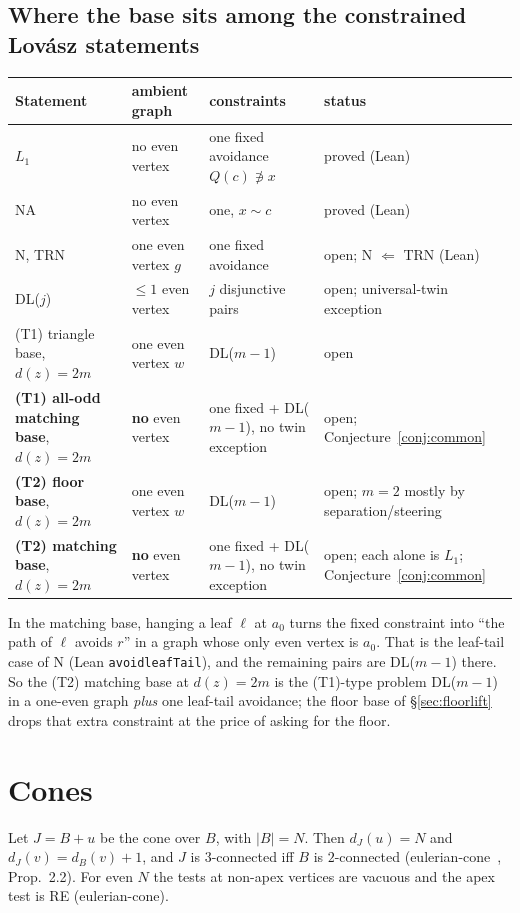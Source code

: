 \documentclass[11pt]{amsart}
\theoremstyle{definition}
\theoremstyle{remark}
\renewcommand{\_}{\oldunderscore\allowbreak}
\begin{document}
\subsection*{Where the base sits among the constrained Lov\'asz statements}
\begin{center}
\begin{tabular}{p{}p{}p{}p{}}
\toprule
Statement & ambient graph & constraints & status\\
\midrule
$L_1$ & no even vertex & one fixed avoidance $Q(c)\not\ni x$ & proved (Lean)\\
NA & no even vertex & one, $x\sim c$ & proved (Lean)\\
N, TRN & one even vertex $g$ & one fixed avoidance & open; N $\Leftarrow$ TRN (Lean)\\
DL($j$) & $\le1$ even vertex & $j$ disjunctive pairs & open; universal-twin exception\\
(T1) triangle base, $d(z)=2m$ & one even vertex $w$ & DL($m-1$) & open\\
\textbf{(T1) all-odd matching base}, $d(z)=2m$ & \textbf{no} even vertex & one fixed + DL($m-1$),
no twin exception & open; Conjecture~\ref{conj:common}\\
\textbf{(T2) floor base}, $d(z)=2m$ & one even vertex $w$ & DL($m-1$) & open; $m=2$ mostly by
separation/steering\\
\textbf{(T2) matching base}, $d(z)=2m$ & \textbf{no} even vertex & one fixed + DL($m-1$),
no twin exception & open; each alone is $L_1$; Conjecture~\ref{conj:common}\\
\bottomrule
\end{tabular}
\end{center}
In the matching base, hanging a leaf $\ell$ at $a_0$ turns the fixed constraint into ``the path of
$\ell$ avoids $r$'' in a graph whose only even vertex is $a_0$. That is the leaf-tail case of N (Lean
\texttt{avoid\_leafTail}), and the remaining pairs are DL($m-1$) there. So the (T2) matching base at
$d(z)=2m$ is the (T1)-type problem DL($m-1$) in a one-even graph \emph{plus} one leaf-tail avoidance;
the floor base of \S\ref{sec:floorlift} drops that extra constraint at the price of asking for the
floor.

\section{Cones}\label{sec:cones}

Let $J=B+u$ be the cone over $B$, with $|B|=N$. Then $d_J(u)=N$ and $d_J(v)=d_B(v)+1$, and $J$ is
$3$-connected iff $B$ is $2$-connected (eulerian-cone~\cite{EC}, Prop.~2.2). For even $N$ the tests at
non-apex vertices are vacuous and the apex test is RE (eulerian-cone).
\end{document}
